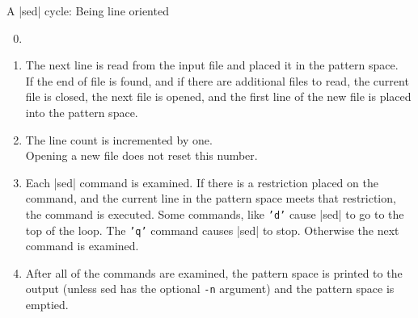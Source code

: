 \begin{frame}{A \bash|sed| cycle: Being line oriented}
    \vspace{-1mm}
    \begin{overlayarea}{\textwidth}{0.26\textheight}
        \begin{enumerate}
            \setcounter{enumi}{-1}
            \item<only@0> %
            \item<only@2> The next line is read from the input file and placed it in the pattern space.\\
                          If the end of file is found, and if there are additional files to read, the current file is closed, the next file is opened, and the first line of the new file is placed into the pattern space.
            \item<only@3> The line count is incremented by one.\\
                          Opening a new file does not reset this number.
            \item<only@4> Each \bash|sed| command is examined.
                          If there is a restriction placed on the command, and the current line in the pattern space meets that restriction, the command is executed.
                          Some commands, like \texttt{'d'} cause \bash|sed| to go to the top of the loop.
                          The \texttt{'q'} command causes \bash|sed| to stop.
                          Otherwise the next command is examined.
            \item<only@5> After all of the commands are examined, the pattern space is printed to the output (unless sed has the optional \texttt{-n} argument) and the pattern space is emptied.
        \end{enumerate}%
    \end{overlayarea}
    \begin{center}
\end{center}
\end{frame}
